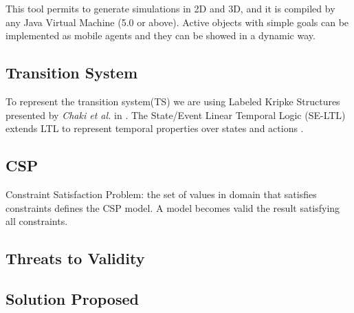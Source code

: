 This tool permits to generate simulations in 2D and 3D, and it is compiled by any Java Virtual Machine (5.0 or above). Active objects with simple goals can be implemented as mobile agents and they can be showed in a dynamic way.



\subsection{Transition System}

To represent the transition system(TS) we are using Labeled Kripke Structures presented by \textit{Chaki et al.} in \cite{ltl02}. The State/Event Linear Temporal Logic (SE-LTL) extends LTL to represent temporal properties over states and actions \cite{ltl01}.

\subsection{CSP}
Constraint Satisfaction Problem: the set of values in domain that satisfies constraints defines the CSP model. A model becomes valid the result satisfying all constraints.






\subsection{Threats to Validity}
\label{sec:threats}


\subsection{Solution Proposed}
